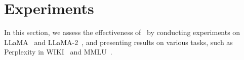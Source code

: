 
\section{Experiments}

In this section, we assess the effectiveness of \asvd~by conducting experiments on LLaMA~\citep{touvron2023llama1} and LLaMA-2~\citep{touvron2023llama2}, and presenting results on various tasks, such as Perplexity in WIKI~\citep{merity2016pointer} and MMLU~\citep{hendrycks2020measuring}. 






